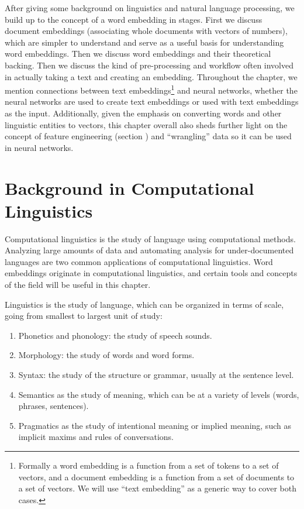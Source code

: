 After giving some background on linguistics and natural language processing, we build up to the concept of a word embedding in stages. First we discuss document embeddings (associating whole documents with vectors of numbers), which are simpler to understand and serve as a useful basis for understanding word embeddings. Then we discuss word embeddings and their theoretical backing.  Then we discuss the kind of pre-processing and workflow often involved in actually taking a text and creating an embedding. Throughout the chapter, we mention connections between text embeddings\footnote{Formally a word embedding is a function from a set of tokens to a set of vectors, and a document embedding is a function from a set of documents to a set of vectors.  We will use ``text embedding'' as a generic way to cover both cases.} and neural networks, whether the neural networks are used to create text embeddings or used with text embeddings as the input.
Additionally, given the emphasis on converting words and other linguistic entities to vectors, this chapter overall also sheds further light on the concept of feature engineering (section ) and ``wrangling'' data so it can be used in neural networks. 

\section{Background in Computational Linguistics}

Computational linguistics is the study of language using computational methods. Analyzing large amounts of data and automating analysis for under-documented languages are two common applications of computational linguistics. Word embeddings originate in computational linguistics, and certain tools and concepts of the field will be useful in this chapter. 

Linguistics is the study of language, which can be organized in terms of scale, going from smallest to largest unit of study: 
\begin{enumerate}
\item Phonetics and phonology: the study of speech sounds.
\item Morphology: the study of words and word forms.
\item Syntax: the study of the structure or grammar, usually at the sentence level.
\item Semantics as the study of meaning, which can be at a variety of levels (words, phrases, sentences).
\item Pragmatics as the study of intentional meaning or implied meaning, such as implicit maxims and rules of conversations. 
\end{enumerate}

